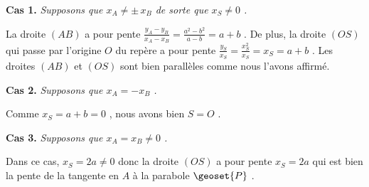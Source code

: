 \textbf{Cas 1.} \emph{Supposons que $x_A \neq \pm \, x_B$ de sorte que $x_S \neq 0$ .}

\medskip

La droite $(AB)$ a pour pente
$\frac{y_A - y_B}{x_A - x_B} = \frac{a^2 - b^2}{a - b} = a + b$ .
De plus, la droite $(OS)$ qui passe par l'origine $O$ du repère a pour pente
$\frac{y_S}{x_S} = \frac{x_S^2}{x_S} = x_S = a + b$ .
Les droites $(AB)$ et $(OS)$ sont bien parallèles comme nous l'avons affirmé.


\bigskip

\textbf{Cas 2.} \emph{Supposons que $x_A = - x_B$ .}

\medskip

Comme $x_S = a + b = 0$ , nous avons bien $S = O$ .


\bigskip

\textbf{Cas 3.} \emph{Supposons que $x_A = x_B \neq 0$ .}

\medskip

Dans ce cas, $x_S = 2a \neq 0$ donc la droite $(OS)$ a pour pente
$x_S = 2a$ qui est bien la pente de la tangente en $A$ à la parabole $\geoset{P}$ .